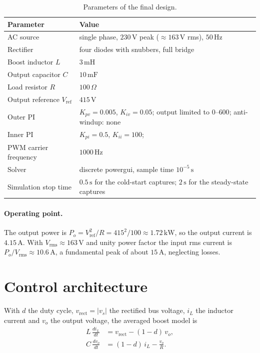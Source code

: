 \documentclass[11pt,a4paper]{article}
\begin{document}
\begin{table}[H]
\centering
\caption{Parameters of the final design.}
\label{tab:params}
\begin{tabular}{@{}p{5.2cm}p{8.6cm}@{}}
\toprule
Parameter & Value \\
\midrule
AC source & single phase, $230\,\mathrm{V}$ peak ($\approx 163\,\mathrm{V}$ rms), $50\,\mathrm{Hz}$ \\
Rectifier & four diodes with snubbers, full bridge \\
Boost inductor $L$ & $3\,\mathrm{mH}$ \\
Output capacitor $C$ & $10\,\mathrm{mF}$ \\
Load resistor $R$ & $100\,\Omega$ \\
Output reference $V_\mathrm{ref}$ & $415\,\mathrm{V}$ \\
Outer PI & $K_{pv}=0.005$, $K_{iv}=0.05$; output limited to $0$--$600$; anti-windup: none \\
Inner PI & $K_{pi}=0.5$, $K_{ii}=100$; \\
PWM carrier frequency & $1000\,\mathrm{Hz}$ \\
Solver & discrete powergui, sample time $10^{-5}\,\mathrm{s}$ \\
Simulation stop time & $0.5\,\mathrm{s}$ for the cold-start captures; $2\,\mathrm{s}$ for the steady-state captures \\
\bottomrule
\end{tabular}
\end{table}

\paragraph{Operating point.} The output power is $P_o = V_\mathrm{ref}^2/R = 415^2/100 \approx 1.72\,\mathrm{kW}$, so the output current is $4.15\,\mathrm{A}$. With $V_\mathrm{rms}\approx 163\,\mathrm{V}$ and unity power factor the input rms current is $P_o/V_\mathrm{rms}\approx 10.6\,\mathrm{A}$, a fundamental peak of about $15\,\mathrm{A}$, neglecting losses.

\section{Control architecture}
\label{sec:control}
With $d$ the duty cycle, $v_\mathrm{rect}=|v_s|$ the rectified bus voltage, $i_L$ the inductor current and $v_o$ the output voltage, the averaged boost model is
\begin{align}
L\,\frac{di_L}{dt} &= v_\mathrm{rect} - (1-d)\,v_o, \\
C\,\frac{dv_o}{dt} &= (1-d)\,i_L - \frac{v_o}{R}.
\end{align}
\end{document}

